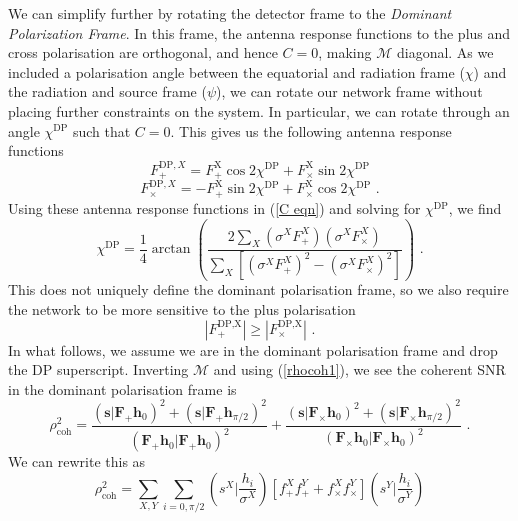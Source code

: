\documentclass[11pt]{cuthesis}
\newcommand{\fs}{\text{ .}}
\begin{document}
We can simplify further by rotating the detector frame to the \textit{Dominant Polarization Frame}. In this frame, the antenna response functions to the plus and cross polarisation are orthogonal, and hence $C=0$, making $\mathcal{M}$ diagonal. As we included a polarisation angle between the equatorial and radiation frame ($\chi$) and the radiation and source frame ($\psi$), we can rotate our network frame without placing further constraints on the system. In particular, we can rotate through an angle $\chi^\text{DP}$ such that $C=0$. This gives us the following antenna response functions 
\begin{equation}
F_+^{\text{DP},X} = F_+^\text{X} \cos 2\chi^\text{DP} + F^\text{X}_\times \sin 2\chi^\text{DP}
\end{equation}
\begin{equation}
F_\times^{\text{DP},X} = -F_+^\text{X} \sin 2\chi^\text{DP} + F^\text{X}_\times \cos 2\chi^\text{DP} \fs
\end{equation}
Using these antenna response functions in (\ref{C eqn}) and solving for $\chi^\text{DP}$, we find
\begin{equation}
\chi^\text{DP} = \frac{1}{4} \arctan \left( \frac{2\sum_X (\sigma^X F^X_+)(\sigma^X F^X_\times)}{\sum_X \left[ (\sigma^X F^X_+)^2 - (\sigma^X F^X_\times)^2 \right] }  \right) \fs
\end{equation}
This does not uniquely define the dominant polarisation frame, so we also require the network to be more sensitive to the plus polarisation
\begin{equation}
|F^\text{DP,X}_+ | \geq | F^\text{DP,X}_\times | \fs
\end{equation}
In what follows, we assume we are in the dominant polarisation frame and drop the DP superscript. Inverting $\mathcal{M}$ and using (\ref{rhocoh1}), we see the coherent SNR in the dominant polarisation frame is
\begin{equation} \label{rhocoh dof}
\rho_\text{coh}^2 = \frac{(\textbf{s}|\textbf{F}_+ \textbf{h}_0)^2 + (\textbf{s}|\textbf{F}_+ \textbf{h}_{\pi/2})^2}{(\textbf{F}_+\textbf{h}_0|\textbf{F}_+\textbf{h}_0)^2} + \frac{(\textbf{s}|\textbf{F}_\times \textbf{h}_0)^2 + (\textbf{s}|\textbf{F}_\times \textbf{h}_{\pi/2})^2}{(\textbf{F}_\times\textbf{h}_0|\textbf{F}_\times\textbf{h}_0)^2} \fs
\end{equation}
We can rewrite this as
\begin{equation} \label{rhocoh}
\rho_\text{coh}^2 = \sum_{X,Y} \sum_{i=0,\pi/2} \left( s^X \bigg| \frac{h_i}{\sigma^X} \right) [f_+^X f_+^Y + f_\times^X f_\times^Y]  \left( s^Y \bigg| \frac{h_i}{\sigma^Y} \right)
\end{equation}
\end{document}
